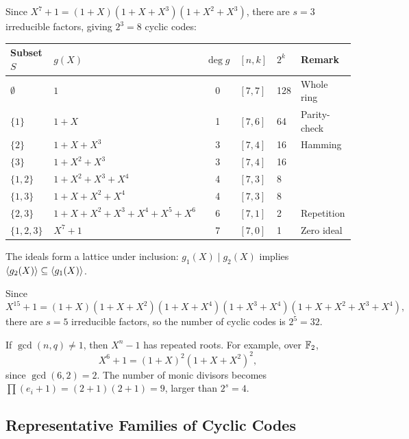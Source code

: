 \begin{example}
Since \(X^7+1=(1+X)(1+X+X^3)(1+X^2+X^3)\), there are \(s=3\) irreducible factors, giving \(2^3=8\) cyclic codes:
\begin{center}
\renewcommand{\arraystretch}{1.1}
\begin{tabular}{@{}p{1.5cm}p{5.5cm}cllp{2.5cm}@{}}
	\toprule
	Subset \(S\) & \(g(X)\) & \(\deg g\) & \([n,k]\) & \(2^k\) & Remark \\
	\midrule
	\(\emptyset\) & \(1\) & 0 & \([7,7]\) & 128 & Whole ring \\
	\(\{1\}\) & \(1+X\) & 1 & \([7,6]\) & 64 & Parity-check \\
	\(\{2\}\) & \(1+X+X^3\) & 3 & \([7,4]\) & 16 & Hamming \\
	\(\{3\}\) & \(1+X^2+X^3\) & 3 & \([7,4]\) & 16 & \\
	\(\{1,2\}\) & \(1+X^2+X^3+X^4\) & 4 & \([7,3]\) & 8 & \\
	\(\{1,3\}\) & \(1+X+X^2+X^4\) & 4 & \([7,3]\) & 8 & \\
	\(\{2,3\}\) & \(1+X+X^2+X^3+X^4+X^5+X^6\) & 6 & \([7,1]\) & 2 & Repetition \\
	\(\{1,2,3\}\) & \(X^7+1\) & 7 & \([7,0]\) & 1 & Zero ideal \\
	\bottomrule
\end{tabular}
\end{center}
The ideals form a lattice under inclusion: \(g_1(X)\mid g_2(X)\) implies \(\langle g_2(X)\rangle\subseteq\langle g_1(X)\rangle\).
\end{example}

\begin{example}[Number of ideals for \(n=15\) over \(\F_2\)]
Since
\[X^{15}+1 = (1+X)(1+X+X^2)(1+X+X^4)(1+X^3+X^4)(1+X+X^2+X^3+X^4),\]
there are \(s=5\) irreducible factors, so the number of cyclic codes is \(2^5=32\).
\end{example}

\begin{remark}
If \(\gcd(n,q)\neq 1\), then \(X^n-1\) has repeated roots. For example, over \(\F_2\),
\[X^6+1=(1+X)^2(1+X+X^2)^2,\]
since \(\gcd(6,2)=2\). The number of monic divisors becomes \(\prod(e_i+1)=(2+1)(2+1)=9\), larger than \(2^s=4\).
\end{remark}

\newpage
\subsection{Representative Families of Cyclic Codes}

